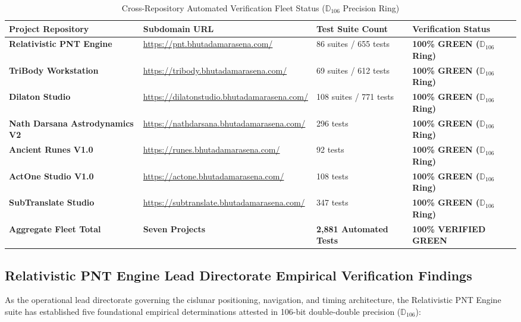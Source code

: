 \documentclass[11pt,a4paper,reqno]{article}
\theoremstyle{plain}
\theoremstyle{definition}
\theoremstyle{remark}
\numberwithin{equation}{section}
\numberwithin{table}{section}
\newcommand{\Ddd}{\mathbb{D}_{106}}
\begin{document}
\begin{table}[H]
\centering
\small
\caption{Cross-Repository Automated Verification Fleet Status ($\Ddd$ Precision Ring)}
\label{tab:fleet_test_status}
\begin{tabularx}{\textwidth}{P{3.8cm}P{4.0cm}P{3.3cm}Y}
\toprule
\textbf{Project Repository} & \textbf{Subdomain URL} & \textbf{Test Suite Count} & \textbf{Verification Status} \\
\midrule
\textbf{Relativistic PNT Engine} & \url{https://pnt.bhutadamarasena.com/} & 86 suites / 655 tests & \textbf{100\% GREEN ($\Ddd$ Ring)} \\
\textbf{TriBody Workstation} & \url{https://tribody.bhutadamarasena.com/} & 69 suites / 612 tests & \textbf{100\% GREEN ($\Ddd$ Ring)} \\
\textbf{Dilaton Studio} & \url{https://dilatonstudio.bhutadamarasena.com/} & 108 suites / 771 tests & \textbf{100\% GREEN ($\Ddd$ Ring)} \\
\textbf{Nath Darsana Astrodynamics V2} & \url{https://nathdarsana.bhutadamarasena.com/} & 296 tests & \textbf{100\% GREEN ($\Ddd$ Ring)} \\
\textbf{Ancient Runes V1.0} & \url{https://runes.bhutadamarasena.com/} & 92 tests & \textbf{100\% GREEN ($\Ddd$ Ring)} \\
\textbf{ActOne Studio V1.0} & \url{https://actone.bhutadamarasena.com/} & 108 tests & \textbf{100\% GREEN ($\Ddd$ Ring)} \\
\textbf{SubTranslate Studio} & \url{https://subtranslate.bhutadamarasena.com/} & 347 tests & \textbf{100\% GREEN ($\Ddd$ Ring)} \\
\midrule
\textbf{Aggregate Fleet Total} & \textbf{Seven Projects} & \textbf{2,881 Automated Tests} & \textbf{100\% VERIFIED GREEN} \\
\bottomrule
\end{tabularx}
\end{table}

\subsection{Relativistic PNT Engine Lead Directorate Empirical Verification Findings}
As the operational lead directorate governing the cislunar positioning, navigation, and timing architecture, the Relativistic PNT Engine suite has established five foundational empirical determinations attested in 106-bit double-double precision ($\Ddd$):
\end{document}
